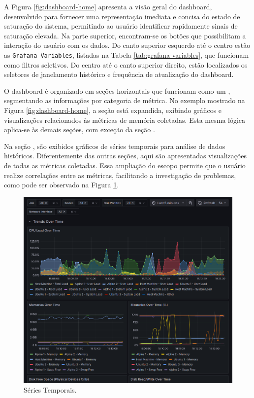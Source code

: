 {\color{red}
A Figura \ref{fig:dashboard-home} apresenta a visão geral do dashboard, desenvolvido para fornecer uma representação imediata e concisa do estado de saturação do sistema, permitindo ao usuário identificar rapidamente sinais de saturação elevada. Na parte superior, encontram-se os botões que possibilitam a interação do usuário com os dados. Do canto superior esquerdo até o centro estão as \verb|Grafana Variables|, listadas na Tabela \ref{tab:grafana-variables}, que funcionam como filtros seletivos. Do centro até o canto superior direito, estão localizados os seletores de janelamento histórico e frequência de atualização do dashboard.

O dashboard é organizado em seções horizontais que funcionam como um , segmentando as informações por categoria de métrica. No exemplo mostrado na Figura \ref{fig:dashboard-home}, a seção  está expandida, exibindo gráficos e visualizações relacionados às métricas de memória coletadas. Esta mesma lógica aplica-se às demais seções, com exceção da seção .

Na seção , são exibidos gráficos de séries temporais para análise de dados históricos. Diferentemente das outras seções, aqui são apresentadas visualizações de todas as métricas coletadas. Essa ampliação do escopo permite que o usuário realize correlações entre as métricas, facilitando a investigação de problemas, como pode ser observado na Figura \ref{fig:dashboard-timeseries}.

\begin{figure}[H]
\centering
\color{red}
\setlength{\abovecaptionskip}{-20pt}
\includegraphics[width=\textwidth]{Imagens/chap04/dashboard/trends_over_time.png}
\caption{Séries Temporais.}
\label{fig:dashboard-timeseries}
\end{figure}

}
